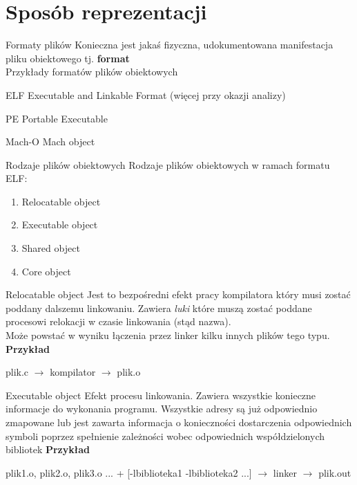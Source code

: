 \section{Sposób reprezentacji}
\begin{frame}{Formaty plików}
  Konieczna jest jakaś fizyczna, udokumentowana manifestacja pliku obiektowego
	tj. \textbf{format}\\

  Przykłady formatów plików obiektowych
  \begin{block}{ELF}
    Executable and Linkable Format (więcej przy okazji analizy)
  \end{block}
  \begin{exampleblock}{PE}
    Portable Executable
  \end{exampleblock}
  \begin{alertblock}{Mach-O}
    Mach object
  \end{alertblock}
\end{frame}
\begin{frame}{Rodzaje plików obiektowych}
  Rodzaje plików obiektowych w ramach formatu ELF:
  \begin{enumerate}
  \item Relocatable object
  \item Executable object
  \item Shared object
  \item Core object
  \end{enumerate}
\end{frame}
\begin{frame}{Relocatable object}
  Jest to bezpośredni efekt pracy kompilatora który musi zostać poddany dalszemu
  linkowaniu. Zawiera \textit{luki} które muszą zostać poddane procesowi
  relokacji w czasie linkowania (stąd nazwa).\\
	Może powstać w wyniku łączenia przez linker kilku innych plików tego typu.\\
	\textbf{Przykład}
  \begin{exampleblock}{}
    plik.c $\rightarrow$ kompilator $\rightarrow$ plik.o
  \end{exampleblock}
\end{frame}
\begin{frame}{Executable object}
  Efekt procesu linkowania. Zawiera wszystkie konieczne informacje do wykonania
  programu. Wszystkie adresy są już odpowiednio zmapowane lub jest zawarta
  informacja o konieczności dostarczenia odpowiednich symboli poprzez spełnienie
  zależności wobec odpowiednich współdzielonych bibliotek \textbf{Przykład}
  \begin{exampleblock}{}
    {plik1.o, plik2.o, plik3.o ...} + [-lbiblioteka1 -lbiblioteka2 ...]
    $\rightarrow$ linker $\rightarrow$ plik.out
  \end{exampleblock}
\end{frame}

